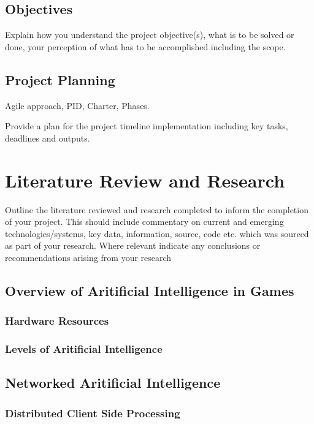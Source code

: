\documentclass[12pt,a4paper,titlepage]{article}
\begin{document}
\subsection{Objectives}

Explain how you understand the project objective(s), what is to be solved or done, your perception of what has to be accomplished including the scope. 

\subsection{Project Planning}
Agile approach, PID, Charter, Phases.

Provide a plan for the project timeline implementation including key tasks, deadlines and outputs.

\section{Literature Review and Research}
Outline the literature reviewed and research completed to inform the completion of your project.  This should include commentary on current and emerging technologies/systems, key data, information, source, code etc. which was sourced as part of your research.  Where relevant indicate any conclusions or recommendations arising from your research

\subsection{Overview of Aritificial Intelligence in Games}

\subsubsection{Hardware Resources}

\subsubsection{Levels of Aritificial Intelligence}

\subsection{Networked Aritificial Intelligence}

\subsubsection{Distributed Client Side Processing}
\end{document}
